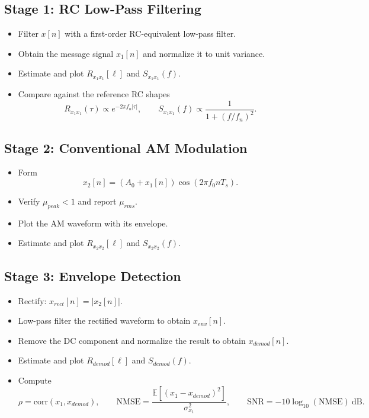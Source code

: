 \documentclass[11pt,a4paper]{article}
\begin{document}
\subsection*{Stage 1: RC Low-Pass Filtering}
\begin{itemize}[leftmargin=1.5em]
  \item Filter $x[n]$ with a first-order RC-equivalent low-pass filter.
  \item Obtain the message signal $x_1[n]$ and normalize it to unit variance.
  \item Estimate and plot $R_{x_1x_1}[\ell]$ and $S_{x_1x_1}(f)$.
  \item Compare against the reference RC shapes
  \[
    R_{x_1x_1}(\tau) \propto e^{-2\pi f_n |\tau|},
    \qquad
    S_{x_1x_1}(f) \propto \frac{1}{1 + (f/f_n)^2}.
  \]
\end{itemize}

\subsection*{Stage 2: Conventional AM Modulation}
\begin{itemize}[leftmargin=1.5em]
  \item Form
  \[
    x_2[n] = (A_0 + x_1[n]) \cos(2\pi f_0 nT_s).
  \]
  \item Verify $\mu_{peak} < 1$ and report $\mu_{rms}$.
  \item Plot the AM waveform with its envelope.
  \item Estimate and plot $R_{x_2x_2}[\ell]$ and $S_{x_2x_2}(f)$.
\end{itemize}

\subsection*{Stage 3: Envelope Detection}
\begin{itemize}[leftmargin=1.5em]
  \item Rectify: $x_{rect}[n] = |x_2[n]|$.
  \item Low-pass filter the rectified waveform to obtain $x_{env}[n]$.
  \item Remove the DC component and normalize the result to obtain $x_{demod}[n]$.
  \item Estimate and plot $R_{demod}[\ell]$ and $S_{demod}(f)$.
  \item Compute
  \[
    \rho = \mathrm{corr}(x_1, x_{demod}),
    \qquad
    \mathrm{NMSE} =
    \frac{\mathbb{E}\!\left[(x_1 - x_{demod})^2\right]}{\sigma_{x_1}^2},
    \qquad
    \mathrm{SNR} = -10 \log_{10}(\mathrm{NMSE})\ \mathrm{dB}.
  \]
\end{itemize}
\end{document}
